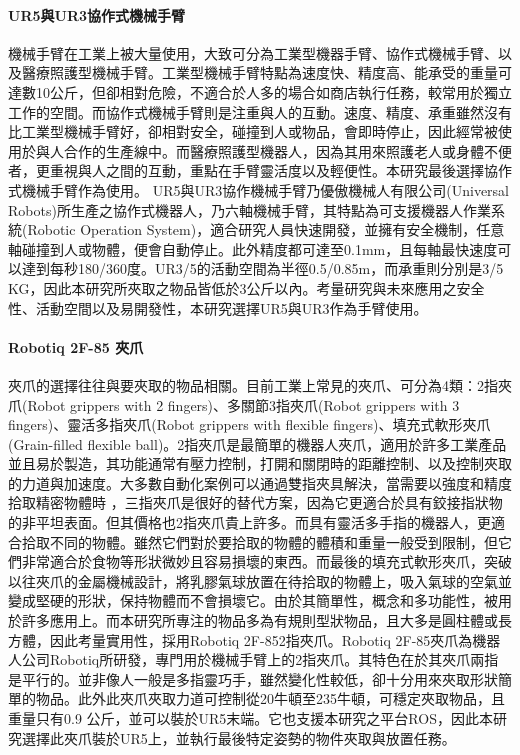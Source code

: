 \paragraph{UR5與UR3協作式機械手臂}
機械手臂在工業上被大量使用，大致可分為工業型機器手臂、協作式機械手臂、以及醫療照護型機械手臂。工業型機械手臂特點為速度快、精度高、能承受的重量可達數10公斤，但卻相對危險，不適合於人多的場合如商店執行任務，較常用於獨立工作的空間。而協作式機械手臂則是注重與人的互動。速度、精度、承重雖然沒有比工業型機械手臂好，卻相對安全，碰撞到人或物品，會即時停止，因此經常被使用於與人合作的生產線中。而醫療照護型機器人，因為其用來照護老人或身體不便者，更重視與人之間的互動，重點在手臂靈活度以及輕便性。本研究最後選擇協作式機械手臂作為使用。
UR5與UR3協作機械手臂乃優傲機械人有限公司(Universal Robots)所生產之協作式機器人，乃六軸機械手臂，其特點為可支援機器人作業系統(Robotic Operation System)，適合研究人員快速開發，並擁有安全機制，任意軸碰撞到人或物體，便會自動停止。此外精度都可達至0.1mm，且每軸最快速度可以達到每秒180/360度。UR3/5的活動空間為半徑0.5/0.85m，而承重則分別是3/5 KG，因此本研究所夾取之物品皆低於3公斤以內。考量研究與未來應用之安全性、活動空間以及易開發性，本研究選擇UR5與UR3作為手臂使用。


\paragraph{Robotiq 2F-85 夾爪}
夾爪的選擇往往與要夾取的物品相關。目前工業上常見的夾爪、可分為4類：2指夾爪(Robot grippers with 2 fingers)、多關節3指夾爪(Robot grippers with 3 fingers)、靈活多指夾爪(Robot grippers with flexible fingers)、填充式軟形夾爪(Grain-filled flexible ball)。2指夾爪是最簡單的機器人夾爪，適用於許多工業產品並且易於製造，其功能通常有壓力控制，打開和關閉時的距離控制、以及控制夾取的力道與加速度。大多數自動化案例可以通過雙指夾具解決，當需要以強度和精度拾取精密物體時
，三指夾爪是很好的替代方案，因為它更適合於具有鉸接指狀物的非平坦表面。但其價格也2指夾爪貴上許多。而具有靈活多手指的機器人，更適合拾取不同的物體。雖然它們對於要拾取的物體的體積和重量一般受到限制，但它們非常適合於食物等形狀微妙且容易損壞的東西。而最後的填充式軟形夾爪，突破以往夾爪的金屬機械設計，將乳膠氣球放置在待拾取的物體上，吸入氣球的空氣並變成堅硬的形狀，保持物體而不會損壞它。由於其簡單性，概念和多功能性，被用於許多應用上。而本研究所專注的物品多為有規則型狀物品，且大多是圓柱體或長方體，因此考量實用性，採用Robotiq 2F-852指夾爪。Robotiq 2F-85夾爪為機器人公司Robotiq所研發，專門用於機械手臂上的2指夾爪。其特色在於其夾爪兩指是平行的。並非像人一般是多指靈巧手，雖然變化性較低，卻十分用來夾取形狀簡單的物品。此外此夾爪夾取力道可控制從20牛頓至235牛頓，可穩定夾取物品，且重量只有0.9 公斤，並可以裝於UR5末端。它也支援本研究之平台ROS，因此本研究選擇此夾爪裝於UR5上，並執行最後特定姿勢的物件夾取與放置任務。

